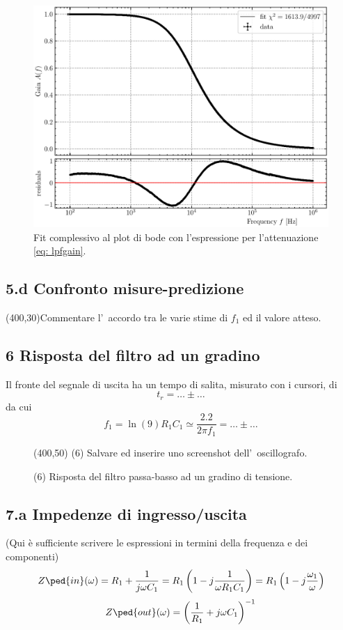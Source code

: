 \documentclass[10pt,a4paper]{article}
\begin{document}
\begin{figure}[htbp]
\centering
\includegraphics[scale=0.7]{lpfbodefit}
\caption{Fit complessivo al plot di bode con l'espressione per l'attenuazione
\eqref{eq: lpfgain}.\label{fig: corner}}
\end{figure}

\subsection*{5.d Confronto misure-predizione}
\vspace{0.5cm}
\framebox(400,30){Commentare l'~accordo tra le varie stime di $f_1$ ed il 
valore atteso.}

\subsection*{6 Risposta del filtro ad un gradino}
Il fronte del segnale di uscita ha un tempo di salita, misurato con i cursori, 
di 
\[
t_r = \ldots\pm \ldots
\]
da cui 
\[
f_1 = \ln(9) R_1 C_1 \simeq \frac{2.2}{2\pi f_1} = \ldots\pm \ldots
\]
\begin{figure}[h]
\centering
\framebox(400,50){ (6) Salvare ed inserire uno screenshot dell'~oscillografo.}
\caption{(6) Risposta del filtro passa-basso ad un gradino di tensione.}
\end{figure}

\subsection*{7.a Impedenze di ingresso/uscita}
(Qui \`e sufficiente scrivere le espressioni in termini della frequenza e dei 
componenti)
\[
Z\ped{in}(\omega) = R_1 + \frac{1}{j \omega C_1} =
R_1 \left( 1 - j \frac{1}{\omega R_1 C_1} \right) =
R_1 \left( 1 - j \frac{\omega_1}{\omega} \right)
\]
\[
Z\ped{out}(\omega) = \left(\frac{1}{R_{1}} + j\omega C_{1}\right)^{-1}
\]
\end{document}

